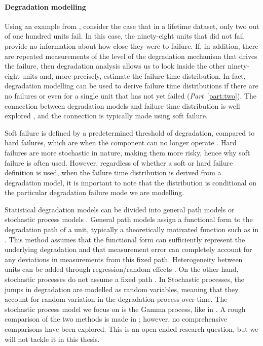 \paragraph*{Degradation modelling} 

Using an example from \citet{meeker2022}, consider the case that in a lifetime dataset, only two out of one hundred units fail. In this case, the ninety-eight units that did not fail provide no information about how close they were to failure. If, in addition, there are repeated measurements of the level of the degradation mechanism that drives the failure, then degradation analysis allows us to look inside the other ninety-eight units and, more precisely, estimate the failure time distribution. In fact, degradation modelling can be used to derive failure time distributions if there are no failures or even for a single unit that has not yet failed (\textit{Part}~\ref{part:two}). The connection between degradation models and failure time distribution is well explored \citep{lu1996,bae2007,meeker2022,lawless2004}, and the connection is typically made using soft failure.

Soft failure is defined by a predetermined threshold of degradation, compared to hard failures, which are when the component can no longer operate \citet{hamada2008}. Hard failures are more stochastic in nature, making them more risky, hence why soft failure is often used. However, regardless of whether a soft or hard failure definition is used, when the failure time distribution is derived from a degradation model, it is important to note that the distribution is conditional on the particular degradation failure mode we are modelling.

Statistical degradation models can be divided into general path models or stochastic process models \citep{pandey2006, si2011}. General path models assign a functional form to the degradation path of a unit, typically a theoretically motivated function such as in \citep{robinson2000}. This method assumes that the functional form can sufficiently represent the underlying degradation and that measurement error can completely account for any deviations in measurements from this fixed path. Heterogeneity between units can be added through regression/random effects \citep{robinson2000}. On the other hand, stochastic processes do not assume a fixed path \citep{pandey2006}. In Stochastic processes, the jumps in degradation are modelled as random variables, meaning that they account for random variation in the degradation process over time. The stochastic process model we focus on is the Gamma process, like in \citep{lawless2004}. A rough comparison of the two methods is made in \citep{zhi-sheng2015}; however, no comprehensive comparisons have been explored. This is an open-ended research question, but we will not tackle it in this thesis.

